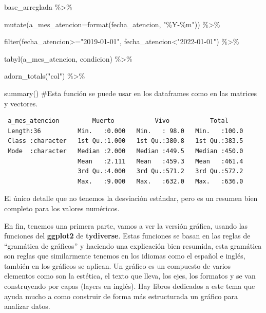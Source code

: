 \documentclass[
  letterpaper,
  DIV=11,
  numbers=noendperiod]{scrreprt}
\newenvironment{Shaded}{\begin{snugshade}}{\end{snugshade}}
\newcommand{\AttributeTok}[1]{\textcolor[rgb]{0.40,0.45,0.13}{#1}}
\newcommand{\CommentTok}[1]{\textcolor[rgb]{0.37,0.37,0.37}{#1}}
\newcommand{\FunctionTok}[1]{\textcolor[rgb]{0.28,0.35,0.67}{#1}}
\newcommand{\NormalTok}[1]{\textcolor[rgb]{0.00,0.23,0.31}{#1}}
\newcommand{\SpecialCharTok}[1]{\textcolor[rgb]{0.37,0.37,0.37}{#1}}
\newcommand{\StringTok}[1]{\textcolor[rgb]{0.13,0.47,0.30}{#1}}
\begin{document}
\begin{Shaded}
\begin{Highlighting}[]
\NormalTok{base\_arreglada }\SpecialCharTok{\%\textgreater{}\%}
  
  \FunctionTok{mutate}\NormalTok{(}\AttributeTok{a\_mes\_atencion=}\FunctionTok{format}\NormalTok{(fecha\_atencion, }\StringTok{"\%Y{-}\%m"}\NormalTok{)) }\SpecialCharTok{\%\textgreater{}\%} 
 
   \FunctionTok{filter}\NormalTok{(fecha\_atencion}\SpecialCharTok{\textgreater{}=}\StringTok{"2019{-}01{-}01"}\NormalTok{, fecha\_atencion}\SpecialCharTok{\textless{}}\StringTok{"2022{-}01{-}01"}\NormalTok{) }\SpecialCharTok{\%\textgreater{}\%} 
  
  \FunctionTok{tabyl}\NormalTok{(a\_mes\_atencion, condicion) }\SpecialCharTok{\%\textgreater{}\%} 
  
  \FunctionTok{adorn\_totals}\NormalTok{(}\StringTok{"col"}\NormalTok{) }\SpecialCharTok{\%\textgreater{}\%} 
  
  \FunctionTok{summary}\NormalTok{() }\CommentTok{\#Esta función se puede usar en los dataframes como en las matrices y vectores.}
\end{Highlighting}
\end{Shaded}

\begin{verbatim}
 a_mes_atencion         Muerto           Vivo           Total      
 Length:36          Min.   :0.000   Min.   : 98.0   Min.   :100.0  
 Class :character   1st Qu.:1.000   1st Qu.:380.8   1st Qu.:383.5  
 Mode  :character   Median :2.000   Median :449.5   Median :450.0  
                    Mean   :2.111   Mean   :459.3   Mean   :461.4  
                    3rd Qu.:4.000   3rd Qu.:571.2   3rd Qu.:572.2  
                    Max.   :9.000   Max.   :632.0   Max.   :636.0  
\end{verbatim}

El único detalle que no tenemos la desviación estándar, pero es un
resumen bien completo para los valores numéricos.

En fin, tenemos una primera parte, vamos a ver la versión gráfica,
usando las funciones del \textbf{ggplot2} de \textbf{tydiverse}. Estas
funciones se basan en las reglas de ``gramática de gráficos'' y haciendo
una explicación bien resumida, esta gramática son reglas que
similarmente tenemos en los idiomas como el español e inglés, también en
los gráficos se aplican. Un gráfico es un compuesto de varios elementos
como son la estética, el texto que lleva, los ejes, los formatos y se
van construyendo por capas (layers en inglés). Hay libros dedicados a
este tema que ayuda mucho a como construir de forma más estructurada un
gráfico para analizar datos.
\end{document}
